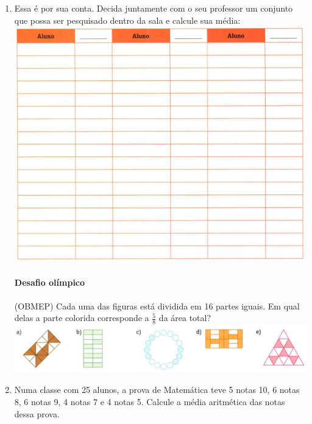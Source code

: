 \documentclass[a4paper,14pt]{article}
\begin{document}
\begin{enumerate}
		\item Essa é por sua conta. Decida juntamente com o seu professor um conjunto que possa ser pesquisado dentro da sala e calcule sua média: \\
		\includegraphics[width=1\linewidth]{6FMA12_imagens/imagem3} \\\\
		\textbf{Desafio olímpico} \\\\
		(OBMEP) Cada uma das figuras está dividida em 16 partes iguais. Em qual delas a parte colorida corresponde a $\frac{5}{8}$ da área total? \\
		\includegraphics[width=1\linewidth]{6FMA12_imagens/imagem4}
		\newpage
		\item Numa classe com 25 alunos, a prova de Matemática teve 5 notas 10, 6 notas 8, 6 notas 9, 4 notas 7 e 4 notas 5. Calcule a média aritmética das notas dessa prova. \\\\\\\\\\\\\\\\\\\\

\end{enumerate}
\end{document}
